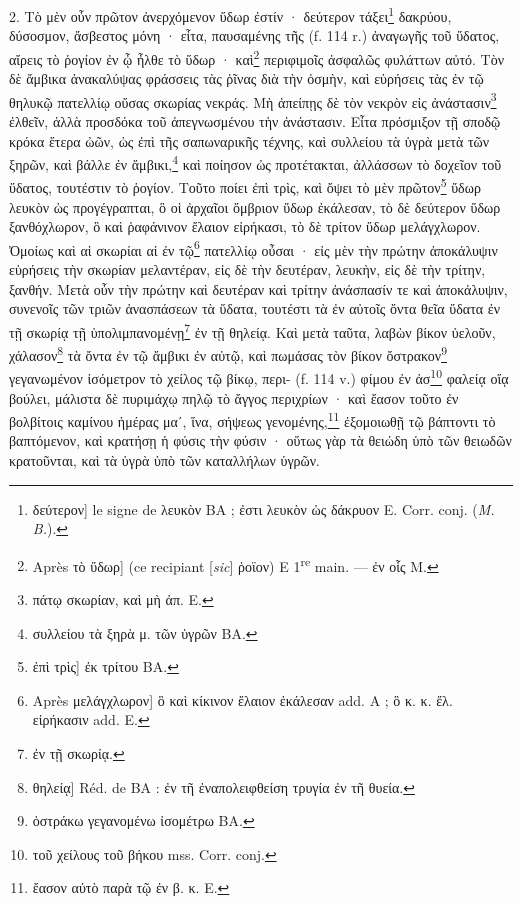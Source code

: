 \documentclass[a4paper, 11pt, oneside, polutonikogreek, french]{article}
\begin{document}
2. Τὸ μὲν οὖν πρῶτον ἀνερχόμενον ὕδωρ ἐστίν · δεύτερον τάξει\footnote{δεύτερον] le signe de λευκὸν BA ; ἐστι λευκὸν ὡς δάκρυον E. Corr. conj. (\emph{M. B.}).} δακρύου, δύσοσμον, ἄσβεστος μόνη · εἶτα, παυσαμένης τῆς (f. 114 r.) ἀναγωγῆς τοῦ ὕδατος, αἴρεις τὸ ῥογίον ἐν ᾦ ἦλθε τὸ ὕδωρ · καὶ\footnote{Après τὸ ὕδωρ] (ce recipiant [\emph{sic}] ῥοϊον) E 1\textsuperscript{re} main. --- ἐν οἷς M.} περιφιμοῖς ἀσφαλῶς φυλάττων αὐτό. Τὸν δὲ ἄμβικα ἀνακαλύψας φράσσεις τὰς ῥῖνας διὰ τὴν ὀσμὴν, καὶ εὑρήσεις τὰς ἐν τῷ θηλυκῷ πατελλίῳ οὔσας σκωρίας νεκράς. Μὴ ἀπείπῃς δὲ τὸν νεκρὸν εἰς ἀνάστασιν\footnote{πάτῳ σκωρίαν, καὶ μὴ ἀπ. E.} ἐλθεῖν, ἀλλὰ προσδόκα τοῦ ἀπεγνωσμένου τὴν ἀνάστασιν. Εἶτα πρόσμιξον τῇ σποδῷ κρόκα ἕτερα ὠῶν, ὡς ἐπὶ τῆς σαπωναρικῆς τέχνης, καὶ συλλείου τὰ ὑγρὰ μετὰ τῶν ξηρῶν, καὶ βάλλε ἐν ἄμβικι,\footnote{συλλείου τὰ ξηρὰ μ. τῶν ὑγρῶν BA.} καὶ ποίησον ὠς προτέτακται, ἀλλάσσων τὸ δοχεῖον τοῦ ὕδατος, τουτέστιν τὸ ῥογίον. Τοῦτο ποίει ἐπὶ τρὶς, καὶ ὄψει τὸ μὲν πρῶτον\footnote{ἐπὶ τρὶς] ἐκ τρίτου BA.} ὕδωρ λευκὸν ὡς προγέγραπται, ὃ οἱ ἀρχαῖοι ὄμβριον ὕδωρ ἐκάλεσαν, τὸ δὲ δεύτερον ὕδωρ ξανθόχλωρον, ὃ καὶ ῥαφάνινον ἔλαιον εἰρήκασι, τὸ δὲ τρίτον ὕδωρ μελάγχλωρον. Ὀμοίως καὶ αἱ σκωρίαι αἱ ἐν τῷ\footnote{Après μελάγχλωρον] ὃ καὶ κίκινον ἔλαιον ἐκάλεσαν add. A ; ὃ κ. κ. ἔλ. εἰρήκασιν add. E.} πατελλίῳ οὖσαι · εἰς μὲν τὴν πρώτην ἀποκάλυψιν εὑρήσεις τὴν σκωρίαν μελαντέραν, εἰς δὲ τὴν δευτέραν, λευκὴν, εἰς δὲ τὴν τρίτην, ξανθήν. Μετὰ οὖν τὴν πρώτην καὶ δευτέραν καὶ τρίτην ἀνάσπασίν τε καὶ ἀποκάλυψιν, συνενοῖς τῶν τριῶν ἀνασπάσεων τὰ ὕδατα, τουτέστι τὰ ἐν αὐτοῖς ὄντα θεῖα ὕδατα ἐν τῇ σκωρίᾳ τῇ ὑπολιμπανομένῃ\footnote{ἐν τῇ σκωρίᾳ.} ἐν τῇ θηλείᾳ. Καὶ μετὰ ταῦτα, λαβὼν βίκον ὑελοῦν, χάλασον\footnote{θηλείᾳ] Réd. de BA : ἐν τῆ ἐναπολειφθείση τρυγία ἐν τῆ θυεία.} τὰ ὄντα ἐν τῷ ἄμβικι ἐν αὐτῷ, καὶ πωμάσας τὸν βίκον ὄστρακον\footnote{ὀστράκω γεγανομένω ἰσομέτρω BA.} γεγανωμένον ἰσόμετρον τὸ χείλος τῷ βίκῳ, περι- (f. 114 v.) φίμου ἐν ἀσ\footnote{τοῦ χείλους τοῦ βήκου mss. Corr. conj.} φαλείᾳ οἵᾳ βούλει, μάλιστα δὲ πυριμάχῳ πηλῷ τὸ ἄγγος περιχρίων · καὶ ἔασον τοῦτο ἐν βολβίτοις καμίνου ἡμέρας μαʹ, ἵνα, σήψεως γενομένης,\footnote{ἔασον αὐτὸ παρὰ τῷ ἐν β. κ. E.} ἐξομοιωθῇ τῷ βάπτοντι τὸ βαπτόμενον, καὶ κρατήσῃ ἡ φύσις τὴν φύσιν · οὕτως γὰρ τὰ θειώδη ὑπὸ τῶν θειωδῶν κρατοῦνται, καὶ τὰ ὑγρὰ ὑπὸ τῶν καταλλήλων ὑγρῶν.
\end{document}
